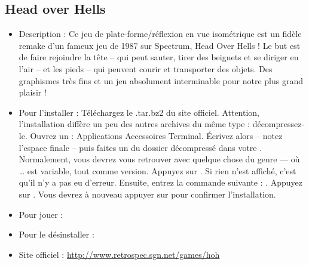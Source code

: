 \subsection{Head over Hells}
\begin{itemize}
\begingroup
{}
\item Description : Ce jeu de plate-forme/réflexion en vue isométrique est un fidèle remake d'un fameux jeu de 1987 sur Spectrum, Head Over Hells ! Le but est de faire rejoindre la tête -- qui peut sauter, tirer des beignets et se diriger en l'air -- et les pieds -- qui peuvent courir et transporter des objets. Des graphismes très fins et un jeu absolument interminable pour notre plus grand plaisir !{\par}
\endgroup
\item Pour l'installer : Téléchargez le .tar.bz2 du site officiel. Attention, l'installation diffère un peu des autres archives du même type : décompressez-le. Ouvrez un  : Applications \FlecheDroite Accessoires \FlecheDroite Terminal. Écrivez alors  -- notez l'espace finale -- puis faites un  du dossier décompressé dans votre . Normalement, vous devrez vous retrouver avec quelque chose du genre  --- où \ldots{} est variable, tout comme version. Appuyez sur . Si rien n'est affiché, c'est qu'il n'y a pas eu d'erreur. Ensuite, entrez la commande suivante : . Appuyez sur . Vous devrez à nouveau appuyer sur  pour confirmer l'installation.{\par}
\item Pour jouer : 
\item Pour le désinstaller : 
\item Site officiel : \url{http://www.retrospec.sgn.net/games/hoh}{\par}
\end{itemize}
